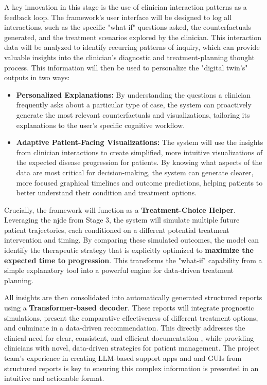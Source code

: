 \documentclass[11pt, a4paper]{article}
\begin{document}
A key innovation in this stage is the use of clinician interaction patterns as a feedback loop. The framework's user interface will be designed to log all interactions, such as the specific "what-if" questions asked, the counterfactuals generated, and the treatment scenarios explored by the clinician. This interaction data will be analyzed to identify recurring patterns of inquiry, which can provide valuable insights into the clinician's diagnostic and treatment-planning thought process. This information will then be used to personalize the "digital twin's" outputs in two ways:
\begin{itemize}
    \item \textbf{Personalized Explanations:} By understanding the questions a clinician frequently asks about a particular type of case, the system can proactively generate the most relevant counterfactuals and visualizations, tailoring its explanations to the user's specific cognitive workflow.
    \item \textbf{Adaptive Patient-Facing Visualizations:} The system will use the insights from clinician interactions to create simplified, more intuitive visualizations of the expected disease progression for patients. By knowing what aspects of the data are most critical for decision-making, the system can generate clearer, more focused graphical timelines and outcome predictions, helping patients to better understand their condition and treatment options.
\end{itemize}

Crucially, the framework will function as a \textbf{Treatment-Choice Helper}. Leveraging the \gls{njde} from Stage 3, the system will simulate multiple future patient trajectories, each conditioned on a different potential treatment intervention and timing. By comparing these simulated outcomes, the model can identify the therapeutic strategy that is explicitly optimized to \textbf{maximize the expected time to progression}. This transforms the "what-if" capability from a simple explanatory tool into a powerful engine for data-driven treatment planning.

All insights are then consolidated into automatically generated structured reports using a \textbf{Transformer-based decoder}. These reports will integrate prognostic simulations, present the comparative effectiveness of different treatment options, and culminate in a data-driven recommendation. This directly addresses the clinical need for clear, consistent, and efficient documentation \cite{JorgHalfmann2023, SacoranskyKwan2024}, while providing clinicians with novel, data-driven strategies for patient management. The project team's experience in creating LLM-based support apps and and GUIs from structured reports is key to ensuring this complex information is presented in an intuitive and actionable format.
\end{document}
